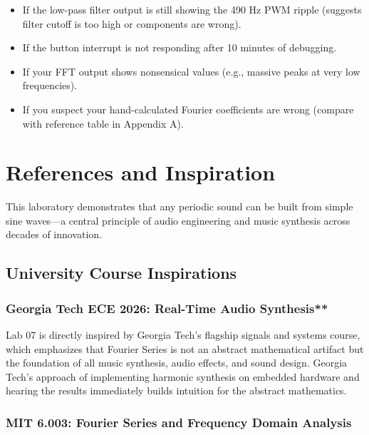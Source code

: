 \documentclass[11pt,letterpaper]{article}
\begin{document}
\begin{itemize}
    \item If the low-pass filter output is still showing the 490 Hz PWM ripple (suggests filter cutoff is too high or components are wrong).
    \item If the button interrupt is not responding after 10 minutes of debugging.
    \item If your FFT output shows nonsensical values (e.g., massive peaks at very low frequencies).
    \item If you suspect your hand-calculated Fourier coefficients are wrong (compare with reference table in Appendix A).
\end{itemize}

\clearpage

\section*{References and Inspiration}

This laboratory demonstrates that any periodic sound can be built from simple sine waves—a central principle of audio engineering and music synthesis across decades of innovation.

\subsection*{University Course Inspirations}

\subsubsection*{Georgia Tech ECE 2026: Real-Time Audio Synthesis**}

Lab 07 is directly inspired by Georgia Tech's flagship signals and systems course, which emphasizes that Fourier Series is not an abstract mathematical artifact but the foundation of all music synthesis, audio effects, and sound design. Georgia Tech's approach of implementing harmonic synthesis on embedded hardware and hearing the results immediately builds intuition for the abstract mathematics.

\subsubsection*{MIT 6.003: Fourier Series and Frequency Domain Analysis}
\end{document}
